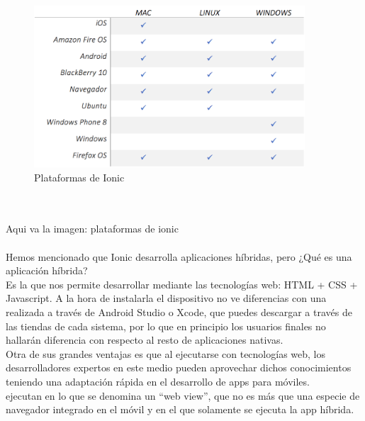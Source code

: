 \documentclass[a4paper, 11pt]{article}
\begin{document}
\begin{itemize}
                      \begin{figure}[H]
                        \centering
                        \includegraphics[width=0.9\textwidth]{tablaPlataformasIonic}
                        \caption{Plataformas de Ionic}
                        \label{f:plataformas}
                      \end{figure}
                      \\\\\textcolor[rgb]{1,0,0}{Aqui va la imagen: plataformas de ionic}\\\\

            Hemos mencionado que Ionic desarrolla aplicaciones híbridas, pero ¿Qué
            es una aplicación híbrida?\\

            Es la que nos permite desarrollar mediante las tecnologías web: HTML +
            CSS + Javascript. A la hora de instalarla el dispositivo no ve
            diferencias con una realizada a través de Android Studio o Xcode, que
            puedes descargar a través de las tiendas de cada sistema, por lo que en
            principio los usuarios finales no hallarán diferencia con respecto al
            resto de aplicaciones nativas.\\

            Otra de sus grandes ventajas es que al ejecutarse con tecnologías web,
            los desarrolladores expertos en este medio pueden aprovechar dichos
            conocimientos teniendo una adaptación rápida en el desarrollo de apps
            para móviles.\\

            ejecutan en lo que se denomina un “web view”, que no es más que una
            especie de navegador integrado en el móvil y en el que solamente se
            ejecuta la app híbrida.\\


\end{itemize}
\end{document}

